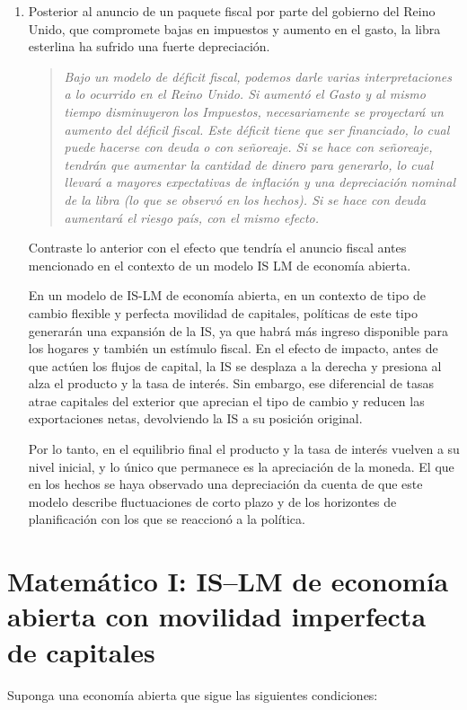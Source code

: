 \documentclass[a4paper]{article}
\begin{document}
\begin{enumerate}
    \item[f)] Posterior al anuncio de un paquete fiscal por parte del gobierno del Reino Unido, que compromete bajas en impuestos y aumento en el gasto, la libra esterlina ha sufrido una fuerte depreciación.

    \begin{quote}
        \textit{Bajo un modelo de déficit fiscal, podemos darle varias interpretaciones a lo ocurrido en el Reino Unido. Si aumentó el Gasto y al mismo tiempo disminuyeron los Impuestos, necesariamente se proyectará un aumento del déficil fiscal. Este déficit tiene que ser financiado, lo cual puede hacerse con deuda o con señoreaje. Si se hace con señoreaje, tendrán que aumentar la cantidad de dinero para generarlo, lo cual llevará a mayores expectativas de inflación y una depreciación nominal de la libra (lo que se observó en los hechos). Si se hace con deuda aumentará el riesgo país, con el mismo efecto.}
    \end{quote}

    Contraste lo anterior con el efecto que tendría el anuncio fiscal antes mencionado en el contexto de un modelo IS LM de economía abierta.
        \begin{solution}
            En un modelo de IS-LM de economía abierta, en un contexto de tipo de cambio flexible y perfecta movilidad de capitales, políticas de este tipo generarán una expansión de la IS, ya que habrá más ingreso disponible para los hogares y también un estímulo fiscal. En el efecto de impacto, antes de que actúen los flujos de capital, la IS se desplaza a la derecha y presiona al alza el producto y la tasa de interés. Sin embargo, ese diferencial de tasas atrae capitales del exterior que aprecian el tipo de cambio y reducen las exportaciones netas, devolviendo la IS a su posición original.\vspace{2mm}

            Por lo tanto, en el equilibrio final el producto y la tasa de interés vuelven a su nivel inicial, y lo único que permanece es la apreciación de la moneda. El que en los hechos se haya observado una depreciación da cuenta de que este modelo describe fluctuaciones de corto plazo y de los horizontes de planificación con los que se reaccionó a la política.
        \end{solution}

\end{enumerate}

\section*{Matemático I: IS–LM de economía abierta con movilidad imperfecta de capitales}
Suponga una economía abierta que sigue las siguientes condiciones:
\end{document}
